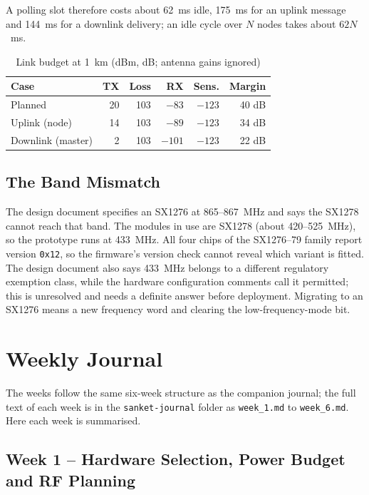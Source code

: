 \documentclass{tietreport}
\begin{document}
A polling slot therefore costs about 62~ms idle, 175~ms for an uplink
message and 144~ms for a downlink delivery; an idle cycle over $N$
nodes takes about $62N$~ms.

\begin{table}[h]
\centering
\small
\begin{tabular}{|l|r|r|r|r|r|}
  \hline
  \textbf{Case} & \textbf{TX} & \textbf{Loss} & \textbf{RX} &
  \textbf{Sens.} & \textbf{Margin} \\
  \hline
  Planned & 20 & 103 & $-83$ & $-123$ & 40 dB \\
  \hline
  Uplink (node) & 14 & 103 & $-89$ & $-123$ & 34 dB \\
  \hline
  Downlink (master) & 2 & 103 & $-101$ & $-123$ & 22 dB \\
  \hline
\end{tabular}
\caption{Link budget at 1~km (dBm, dB; antenna gains ignored)}
\end{table}

\section{The Band Mismatch}

The design document specifies an SX1276 at 865--867~MHz and says the
SX1278 cannot reach that band. The modules in use are SX1278
(about 420--525~MHz), so the prototype runs at 433~MHz. All four chips
of the SX1276--79 family report version \texttt{0x12}, so the
firmware's version check cannot reveal which variant is fitted. The
design document also says 433~MHz belongs to a different regulatory
exemption class, while the hardware configuration comments call it
permitted; this is unresolved and needs a definite answer before
deployment. Migrating to an SX1276 means a new frequency word and
clearing the low-frequency-mode bit.

\chapter{Weekly Journal}

The weeks follow the same six-week structure as the companion
journal; the full text of each week is in the \texttt{sanket-journal}
folder as \texttt{week\_1.md} to \texttt{week\_6.md}. Here each week is
summarised.

\section{Week 1 -- Hardware Selection, Power Budget and RF Planning}
\end{document}
